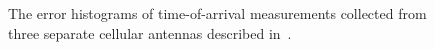 \documentclass{article}
\begin{document}
%
%
\begin{figure}[]
	\centering
	\hfil
	\hfil
	\caption{The error histograms of time-of-arrival measurements collected from three separate cellular antennas described in~\citep{conf:PIMRC_medbo_09}.}
	\label{fig:kista}
\end{figure}
%
%
\end{document}
